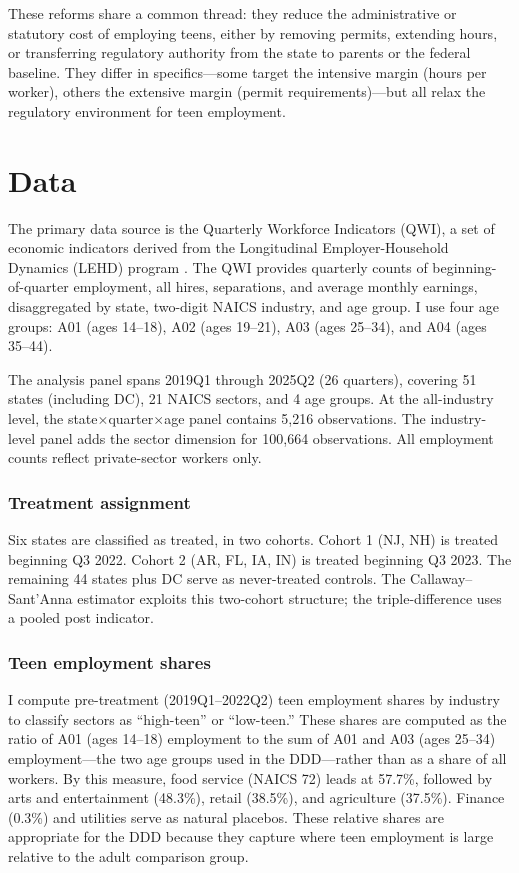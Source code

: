 \documentclass[12pt]{article}
\begin{document}
These reforms share a common thread: they reduce the administrative or statutory cost of employing teens, either by removing permits, extending hours, or transferring regulatory authority from the state to parents or the federal baseline. They differ in specifics---some target the intensive margin (hours per worker), others the extensive margin (permit requirements)---but all relax the regulatory environment for teen employment.


\section{Data}
\label{sec:data}

The primary data source is the Quarterly Workforce Indicators (QWI), a set of economic indicators derived from the Longitudinal Employer-Household Dynamics (LEHD) program \citep{abowd2009lehd}. The QWI provides quarterly counts of beginning-of-quarter employment, all hires, separations, and average monthly earnings, disaggregated by state, two-digit NAICS industry, and age group. I use four age groups: A01 (ages 14--18), A02 (ages 19--21), A03 (ages 25--34), and A04 (ages 35--44).

The analysis panel spans 2019Q1 through 2025Q2 (26 quarters), covering 51 states (including DC), 21 NAICS sectors, and 4 age groups. At the all-industry level, the state$\times$quarter$\times$age panel contains 5,216 observations. The industry-level panel adds the sector dimension for 100,664 observations. All employment counts reflect private-sector workers only.

\subsubsection*{Treatment assignment} Six states are classified as treated, in two cohorts. Cohort 1 (NJ, NH) is treated beginning Q3 2022. Cohort 2 (AR, FL, IA, IN) is treated beginning Q3 2023. The remaining 44 states plus DC serve as never-treated controls. The Callaway--Sant'Anna estimator exploits this two-cohort structure; the triple-difference uses a pooled post indicator.

\subsubsection*{Teen employment shares} I compute pre-treatment (2019Q1--2022Q2) teen employment shares by industry to classify sectors as ``high-teen'' or ``low-teen.'' These shares are computed as the ratio of A01 (ages 14--18) employment to the sum of A01 and A03 (ages 25--34) employment---the two age groups used in the DDD---rather than as a share of all workers. By this measure, food service (NAICS 72) leads at 57.7\%, followed by arts and entertainment (48.3\%), retail (38.5\%), and agriculture (37.5\%). Finance (0.3\%) and utilities serve as natural placebos. These relative shares are appropriate for the DDD because they capture where teen employment is large relative to the adult comparison group.
\end{document}
